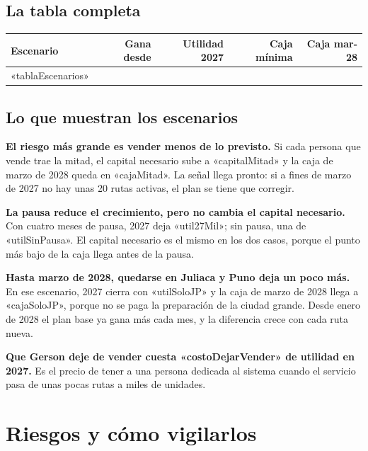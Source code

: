 \documentclass[10.5pt,a4paper]{article}
\begin{document}
\subsection{La tabla completa}

{\small
\begin{tabularx}{\linewidth}{@{}Xrrrr@{}}
\toprule
Escenario & Gana desde & Utilidad 2027 & Caja mínima & Caja mar-28\\
\midrule
«tablaEscenarios»
\bottomrule
\end{tabularx}}

\subsection{Lo que muestran los escenarios}

\textbf{El riesgo más grande es vender menos de lo previsto.} Si cada persona que vende trae la mitad, el capital necesario sube a «capitalMitad» y la caja de marzo de 2028 queda en «cajaMitad». La señal llega pronto: si a fines de marzo de 2027 no hay unas 20 rutas activas, el plan se tiene que corregir.

\textbf{La pausa reduce el crecimiento, pero no cambia el capital necesario.} Con cuatro meses de pausa, 2027 deja «util27Mil»; sin pausa, una de «utilSinPausa». El capital necesario es el mismo en los dos casos, porque el punto más bajo de la caja llega antes de la pausa.

\textbf{Hasta marzo de 2028, quedarse en Juliaca y Puno deja un poco más.} En ese escenario, 2027 cierra con «utilSoloJP» y la caja de marzo de 2028 llega a «cajaSoloJP», porque no se paga la preparación de la ciudad grande. Desde enero de 2028 el plan base ya gana más cada mes, y la diferencia crece con cada ruta nueva.

\textbf{Que Gerson deje de vender cuesta «costoDejarVender» de utilidad en 2027.} Es el precio de tener a una persona dedicada al sistema cuando el servicio pasa de unas pocas rutas a miles de unidades.

\section{Riesgos y cómo vigilarlos}
\end{document}
